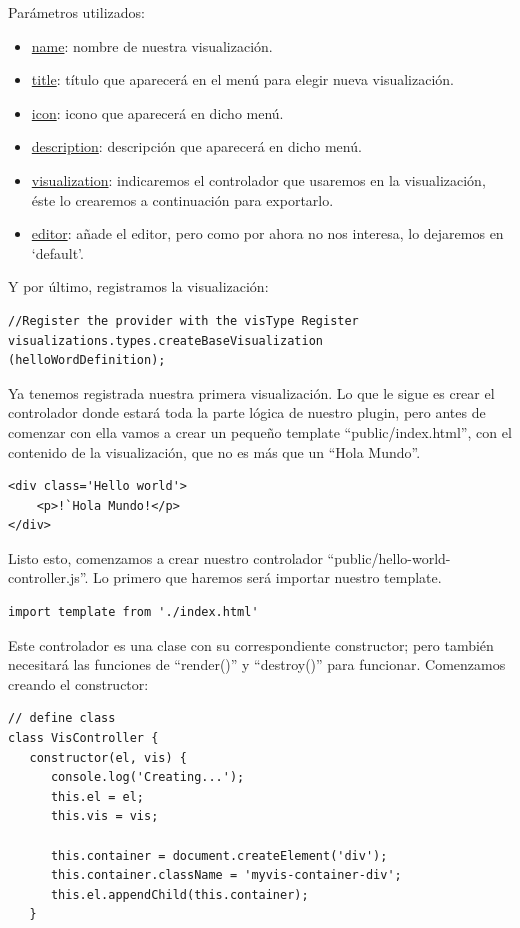 \documentclass[a4paper, 12pt]{book}
\begin{document}
Parámetros utilizados:
\begin{itemize}
    \item \underline{name}: nombre de nuestra visualización.
    \item \underline{title}: título que aparecerá en el menú para elegir nueva visualización.
    \item \underline{icon}: icono que aparecerá en dicho menú.
    \item \underline{description}:  descripción que aparecerá en dicho menú.
    \item \underline{visualization}: indicaremos el controlador que usaremos en la visualización, éste lo crearemos a continuación para exportarlo.
    \item \underline{editor}: añade el editor, pero como por ahora no nos interesa, lo dejaremos en ‘default’.
\end{itemize}

Y por último, registramos la visualización:

\begin{lstlisting}[frame=single]
//Register the provider with the visType Register
visualizations.types.createBaseVisualization
(helloWordDefinition);
\end{lstlisting}

Ya tenemos registrada nuestra primera visualización. Lo que le sigue es crear el controlador donde estará toda la parte lógica de nuestro plugin, pero antes de comenzar con ella vamos a crear un pequeño template “public/index.html”, con el contenido de la visualización, que no es más que un “Hola Mundo”.

\begin{lstlisting}[frame=single]
<div class='Hello world'>
    <p>!`Hola Mundo!</p>
</div>
\end{lstlisting}

Listo esto, comenzamos a crear nuestro controlador “public/hello-world-controller.js”. Lo primero que haremos será importar nuestro template.

\begin{lstlisting}[frame=single]
import template from './index.html'
\end{lstlisting}

Este controlador es una clase con su correspondiente constructor; pero también necesitará las funciones de “render()” y “destroy()” para funcionar. Comenzamos creando el constructor:

\begin{lstlisting}[frame=single]
// define class
class VisController {
   constructor(el, vis) {
      console.log('Creating...');
      this.el = el;
      this.vis = vis;

      this.container = document.createElement('div');
      this.container.className = 'myvis-container-div';
      this.el.appendChild(this.container);
   }
\end{lstlisting}
\end{document}

